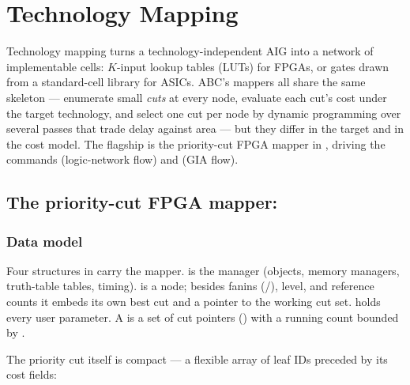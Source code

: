 \chapter{Technology Mapping}
\label{ch:map}

Technology mapping turns a technology-independent AIG into a network of
implementable cells: $K$-input lookup tables (LUTs) for FPGAs, or gates drawn
from a standard-cell library for ASICs. ABC's mappers all share the same
skeleton --- enumerate small \emph{cuts} at every node, evaluate each cut's cost
under the target technology, and select one cut per node by dynamic programming
over several passes that trade delay against area --- but they differ in the
target and in the cost model. The flagship is the priority-cut FPGA mapper in
, driving the commands  (logic-network flow) and
 (GIA flow).


\section{The priority-cut FPGA mapper: }

\subsection{Data model}

Four structures in  carry the mapper.  is the
manager (objects, memory managers, truth-table tables, timing).  is
a node; besides fanins (/), level, and reference counts
it embeds its own best cut  and a pointer  to the working
cut set.  holds every user parameter. A  is a set of
cut pointers () with a running count  bounded by
.

The priority cut itself is compact --- a flexible array of leaf IDs preceded by
its cost fields:

